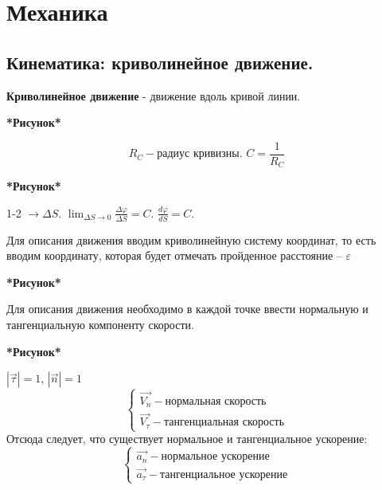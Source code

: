 \documentclass[a4paper,oneside]{article}
\theoremstyle{definition}
\newtheorem{definition}{Определение}[subsection]
\theoremstyle{definition}
\theoremstyle{definition}
\newcommand{\tbf}[1]{\textbf{#1}}
\newcommand{\dslim}{\displaystyle\lim}
\begin{document}
    




\section{Механика}
\subsection{Кинематика: криволинейное движение.}
    \tbf{Криволинейное движение} - движение вдоль кривой линии.

\tbf{*Рисунок*}

\[R_C - \text{радиус кривизны. } C = \frac{1}{R_C}\]

\tbf{*Рисунок*}

1-2 $\rightarrow \Delta S$. $\dslim_{\Delta S \to 0} \frac{\Delta \varphi}{\Delta S} = C$. $\frac {d \varphi}{dS} = C$.

Для описания движения вводим криволинейную систему координат, то есть вводим координату, которая будет отмечать
пройденное расстояние -- $\varepsilon$

\tbf{*Рисунок*}

Для описания движения необходимо в каждой точке ввести нормальную и тангенциальную компоненту скорости.

\tbf{*Рисунок*}

$| \vec{\tau} | = 1$, $| \vec{n} | = 1$
\[
\begin{cases}
    \vec{V_n} - \text{нормальная скорость} \\
    \vec{V_\tau} - \text{тангенциальная скорость}
\end{cases}
\]    
Отсюда следует, что существует нормальное и тангенциальное ускорение:
\[
\begin{cases}
    \vec{a_n} - \text{нормальное ускорение} \\
    \vec{a_\tau} - \text{тангенциальное ускорение}
\end{cases}
\]
\end{document}
